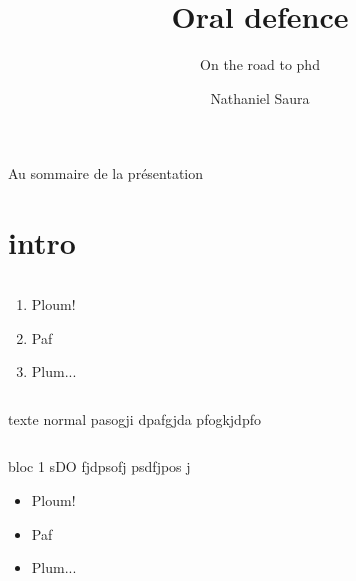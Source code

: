 \documentclass[11pt, xcolor=svgnames]{beamer}
\begin{document}
\title{Oral defence} %
\subtitle{\color{brick} On the road to phd} %
\author{Nathaniel Saura}

\begin{darkframes}

\frame{\maketitle}

\begin{frame}{Au sommaire de la présentation}
\tableofcontents
\end{frame}

\section{intro}
\begin{frame}
\begin{columns}
\begin{column}{.5\textwidth}
\begin{enumerate}
  \item<1,3> Ploum!
  \item<3> Paf
  \item Plum...
  \end{enumerate}
\end{column}
\begin{column}{.5\textwidth}
\RaggedRight
\vspace{-3cm}


\end{column}
\end{columns} 
\vspace{1cm}
texte normal pasogji dpafgjda pfogkjdpfo
\end{frame}

\begin{frame}
\begin{columns}
\begin{column}{.5\textwidth}
\begin{block}{bloc 1}
sDO fjdpsofj psdfjpos j
\begin{itemize}
  \item<1,3> Ploum!
  \item<3> Paf
  \item Plum...
  \end{itemize}\end{block}
\end{column}


\end{columns}
\end{frame}
\end{darkframes}
\end{document}
